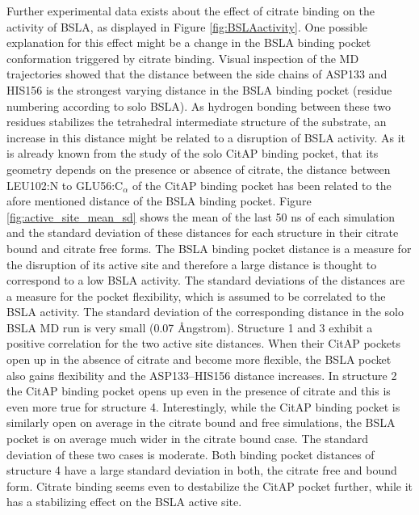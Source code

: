 \documentclass[english, a4paper, 12pt, titlepage, draft]{article}
\begin{document}
Further experimental data exists about the effect of citrate binding on the activity of BSLA, as displayed in Figure \ref{fig:BSLAactivity}.
One possible explanation for this effect might be a change in the BSLA binding pocket conformation triggered by citrate binding.
Visual inspection of the MD trajectories showed that the distance between the side chains of ASP133 and HIS156 is the strongest varying distance in the BSLA binding pocket (residue numbering according to solo BSLA).
As hydrogen bonding between these two residues stabilizes the tetrahedral intermediate structure of the substrate, an increase in this distance might be related to a disruption of BSLA activity.
As it is already known from the study of the solo CitAP binding pocket, that its geometry depends on the presence or absence of citrate, the distance between LEU102:N to GLU56:C$_{\alpha}$ of the CitAP binding pocket has been related to the afore mentioned distance of the BSLA binding pocket.
Figure \ref{fig:active_site_mean_sd} shows the mean of the last 50 ns of each simulation and the standard deviation of these distances for each structure in their citrate bound and citrate free forms.
The BSLA binding pocket distance is a measure for the disruption of its active site and therefore a large distance is thought to correspond to a low BSLA activity.
The standard deviations of the distances are a measure for the pocket flexibility, which is assumed to be correlated to the BSLA activity.
The standard deviation of the corresponding distance in the solo BSLA MD run is very small (0.07 \r{A}ngstrom).
Structure 1 and 3 exhibit a positive correlation for the two active site distances.
When their CitAP pockets open up in the absence of citrate and become more flexible, the BSLA pocket also gains flexibility and the ASP133--HIS156 distance increases.
In structure 2 the CitAP binding pocket opens up even in the presence of citrate and this is even more true for structure 4.
Interestingly, while the CitAP binding pocket is similarly open on average in the citrate bound and free simulations, the BSLA pocket is on average much wider in the citrate bound case.
The standard deviation of these two cases is moderate.
Both binding pocket distances of structure 4 have a large standard deviation in both, the citrate free and bound form.
Citrate binding seems even to destabilize the CitAP pocket further, while it has a stabilizing effect on the BSLA active site.
\end{document}
